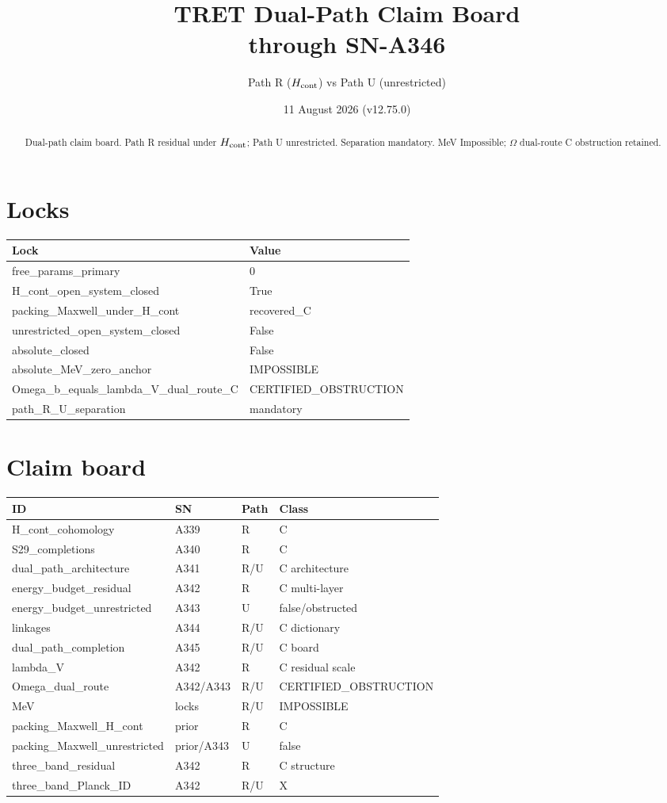 \documentclass[11pt,a4paper]{article}
\title{TRET Dual-Path Claim Board\\through SN-A346}
\author{Path R ($H_{\rm cont}$) vs Path U (unrestricted)}
\date{11 August 2026 (v12.75.0)}
\begin{document}
\maketitle
\begin{abstract}
Dual-path claim board. Path R residual under $H_{\rm cont}$; Path U unrestricted.
Separation mandatory. MeV Impossible; $\Omega$ dual-route C obstruction retained.
\end{abstract}
\section{Locks}
\begin{center}\begin{tabular}{@{}ll@{}}\toprule Lock & Value \\\midrule
free\_params\_primary & 0 \\
H\_cont\_open\_system\_closed & True \\
packing\_Maxwell\_under\_H\_cont & recovered\_C \\
unrestricted\_open\_system\_closed & False \\
absolute\_closed & False \\
absolute\_MeV\_zero\_anchor & IMPOSSIBLE \\
Omega\_b\_equals\_lambda\_V\_dual\_route\_C & CERTIFIED\_OBSTRUCTION \\
path\_R\_U\_separation & mandatory \\
\bottomrule\end{tabular}\end{center}
\section{Claim board}
\begin{center}\begin{tabular}{@{}p{3.4cm}p{1.6cm}p{1.4cm}p{4.5cm}@{}}
\toprule ID & SN & Path & Class \\\midrule
H\_cont\_cohomology & A339 & R & C \\
S29\_completions & A340 & R & C \\
dual\_path\_architecture & A341 & R/U & C architecture \\
energy\_budget\_residual & A342 & R & C multi-layer \\
energy\_budget\_unrestricted & A343 & U & false/obstructed \\
linkages & A344 & R/U & C dictionary \\
dual\_path\_completion & A345 & R/U & C board \\
lambda\_V & A342 & R & C residual scale \\
Omega\_dual\_route & A342/A343 & R/U & CERTIFIED_OBSTRUCTION \\
MeV & locks & R/U & IMPOSSIBLE \\
packing\_Maxwell\_H\_cont & prior & R & C \\
packing\_Maxwell\_unrestricted & prior/A343 & U & false \\
three\_band\_residual & A342 & R & C structure \\
three\_band\_Planck\_ID & A342 & R/U & X \\
\bottomrule\end{tabular}\end{center}
\end{document}
